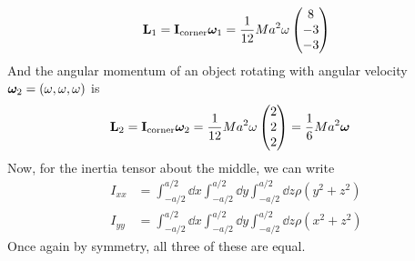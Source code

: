 \begin{example}
    \[ \mathbf{L}_1 = \mathbf{I}_\text{corner}\boldsymbol{\omega}_1 = \frac{1}{12}Ma^2 \omega\begin{pmatrix}
        8 \\ -3 \\ -3
    \end{pmatrix}\]
    And the angular momentum of an object rotating with angular velocity $\boldsymbol{\omega}_2 = (\omega, \omega, \omega)$ is 
    \begin{align*}
        \mathbf{L}_2 = \mathbf{I}_\text{corner}\boldsymbol{\omega}_2 &= \frac{1}{12}Ma^2\omega \begin{pmatrix}
                2 \\ 2\\ 2
        \end{pmatrix} = \frac{1}{6}Ma^2\boldsymbol{\omega}
    \end{align*}
    Now, for the inertia tensor about the middle, we can write
    \begin{align*}
        I_{xx} &= \int_{-a/2}^{a/2} \dd x \int_{-a/2}^{a/2}\dd y \int_{-a/2}^{a/2} \dd z \rho(y^2+z^2) \\
        I_{yy} &= \int_{-a/2}^{a/2} \dd x \int_{-a/2}^{a/2}\dd y \int_{-a/2}^{a/2} \dd z \rho(x^2+z^2)
    \end{align*}
    Once again by symmetry, all three of these are equal.
\end{example}
